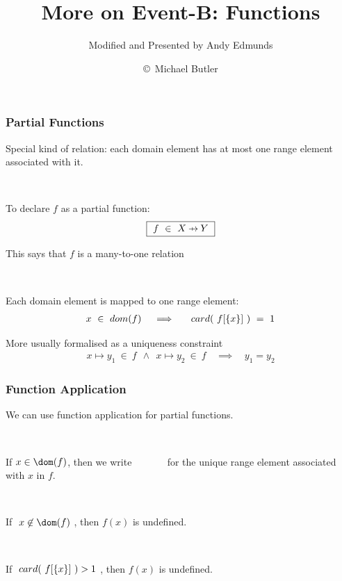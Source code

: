 \documentclass{beamer}
\title{More on Event-B: Functions}
\subtitle{Modified and Presented by Andy Edmunds}
\author{\copyright\ Michael Butler}
\institute{ University of Southampton }
\begin{document}
\begin{frame}

\titlepage

\end{frame}














\begin{frame}

\frametitle{Partial Functions}

Special kind of relation:
each domain element has \alert{at most one range element }associated with
it. 

~

To declare $f$ as a partial function:
\[
     \mbox{\fbox{$~f ~\in~ X\pfun Y~$}}
\]

This says that $f$ is a \alert{many-to-one} relation

~

Each domain element is mapped to  \alert{one} range element:
\begin{eqnarray*}
    x~\in~ dom(f) ~
    &~~\implies~~& card(~f[\{x\}]~) ~=~ 1
\end{eqnarray*}

More usually formalised as a \alert{uniqueness} constraint
\begin{eqnarray*}
    x\mapsto y_{1}~\in~ f ~~\land~~ x\mapsto y_{2}~\in~ f
    &~~\implies~~& y_{1} = y_{2}
\end{eqnarray*}

\end{frame}



\begin{frame}


\frametitle{Function Application}

We can use \alert{function application} for partial functions.

~


If $x\in \dom(f)$, then we write ~~~~~~ for the
\alert{unique} range element associated with $x$ in $f$.

~

If $~x\not\in\dom(f)~$, then $f(x)$ is \alert{undefined}.

~

If $~card(~f[\{x\}]~)>1~$, then $f(x)$ is \alert{undefined}.

\end{frame}
\end{document}
